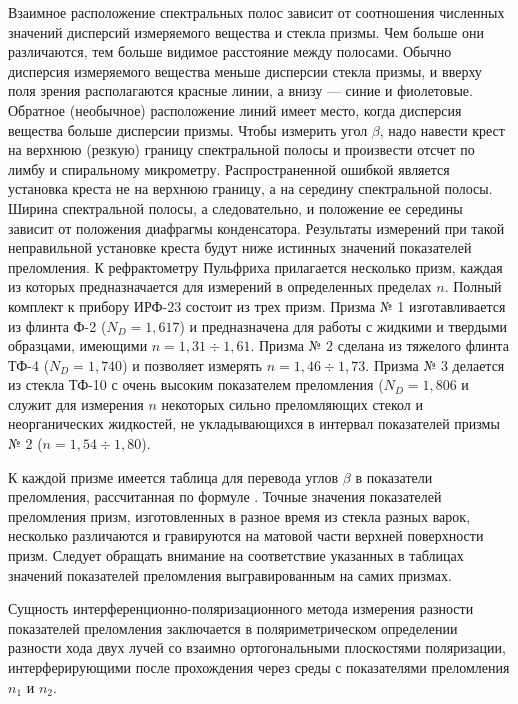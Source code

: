 Взаимное расположение спектральных полос зависит от соотношения
численных значений дисперсий измеряемого вещества и стекла призмы.
Чем больше они различаются, тем больше видимое расстояние между
полосами. Обычно дисперсия измеряемого вещества меньше дисперсии
стекла призмы, и вверху поля зрения располагаются красные линии, а
внизу --- синие и фиолетовые. Обратное (необычное) расположение
линий имеет место, когда дисперсия вещества больше дисперсии
призмы. Чтобы измерить угол $\beta$, надо навести крест на верхнюю
(резкую) границу спектральной полосы и произвести отсчет по лимбу
и спиральному микрометру. Распространенной ошибкой является
установка креста не на верхнюю границу, а на середину спектральной
полосы. Ширина спектральной полосы, а следовательно, и положение
ее середины зависит от положения диафрагмы конденсатора.
Результаты измерений при такой неправильной установке креста будут
ниже истинных значений показателей преломления. К рефрактометру
Пульфриха прилагается несколько призм, каждая из которых
предназначается для измерений в определенных пределах $n$. Полный
комплект к прибору ИРФ-23 состоит из трех призм. Призма № 1
изготавливается из флинта Ф-2 ($N_D=1,617$) и предназначена для
работы с жидкими и твердыми образцами, имеющими $n=1,31\div 1,61$.
Призма № 2 сделана из тяжелого флинта ТФ-4 ($N_D=1,740$) и
позволяет измерять $n=1,46\div 1,73$. Призма № 3 делается из
стекла ТФ-10 с очень высоким показателем преломления ($N_D=1,806$
и служит для измерения $n$ некоторых сильно преломляющих стекол и
неорганических жидкостей, не укладывающихся в интервал показателей
призмы № 2 ($n=1,54\div 1,80$).

К каждой призме имеется таблица для перевода углов $\beta$ в
показатели преломления, рассчитанная по формуле . Точные
значения показателей преломления призм, изготовленных в разное
время из стекла разных варок, несколько различаются и гравируются
на матовой части верхней поверхности призм. Следует обращать
внимание на соответствие указанных в таблицах значений показателей
преломления выгравированным на самих призмах.



Сущность
интерференционно-поляризационного метода измерения разности
показателей преломления заключается в поляриметрическом
определении разности хода двух лучей со взаимно ортогональными
плоскостями поляризации, интерферирующими после прохождения через
среды с показателями преломления $n_1$ и $n_2$.

